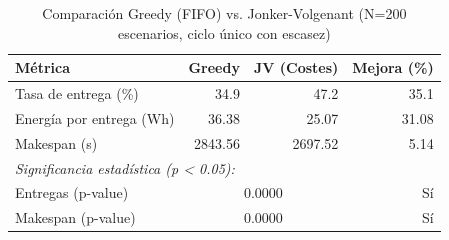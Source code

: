 \begin{table}[htbp]
\centering
\caption{Comparación Greedy (FIFO) vs. Jonker-Volgenant (N=200 escenarios, ciclo único con escasez)}
\label{tab:comparison}
\begin{tabular}{lrrr}
\hline
\textbf{Métrica} & \textbf{Greedy} & \textbf{JV (Costes)} & \textbf{Mejora (\%)} \\
\hline
Tasa de entrega (\%) & 34.9 & 47.2 & 35.1 \\
Energía por entrega (Wh) & 36.38 & 25.07 & 31.08 \\
Makespan (s) & 2843.56 & 2697.52 & 5.14 \\
\hline
\multicolumn{4}{l}{\textit{Significancia estadística (p < 0.05):}} \\
Entregas (p-value) & \multicolumn{2}{c}{0.0000} & Sí \\
Makespan (p-value) & \multicolumn{2}{c}{0.0000} & Sí \\
\hline
\end{tabular}
\end{table}